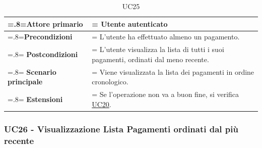                 \begin{table}[H]
                    \centering
                    \renewcommand{\arraystretch}{1.8}
                    \renewcommand\tabularxcolumn[1]{m{#1}}
                    \begin{tabularx}{0.9\textwidth} {
                        >{\hsize=.8\hsize\linewidth=\hsize}X
                        >{\hsize=1.2\hsize\linewidth=\hsize}X}
                        \hline
                        \textbf{Attore primario} & Utente autenticato \\
                        \hline
                        \textbf{Precondizioni} & L'utente ha effettuato almeno un pagamento. \\
                        \hline
                        \textbf{Postcondizioni} & L'utente visualizza la lista di tutti i suoi pagamenti, ordinati dal meno recente. \\
                        \hline
                        \textbf{Scenario principale} & Viene visualizzata la lista dei pagamenti in ordine cronologico. \\
                        \hline
                        \textbf{Estensioni} & Se l'operazione non va a buon fine, si verifica \hyperref[UC20]{UC20}. \\
                        \hline
                    \end{tabularx}
                    \caption{UC25}
                \end{table}

        \subsubsection{UC26 - Visualizzazione Lista Pagamenti ordinati dal più recente}
        \label{UC26}


